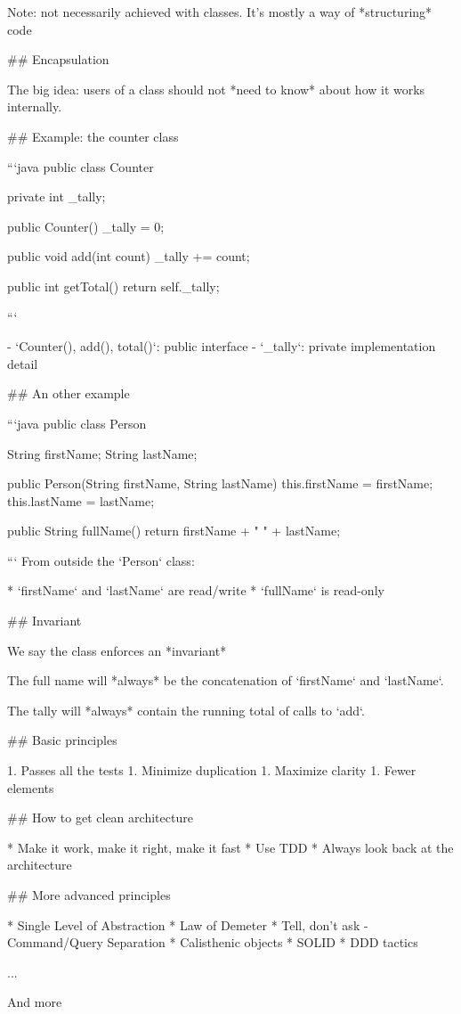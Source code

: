 Note: not necessarily achieved with classes. It's mostly a way
of *structuring* code

## Encapsulation

The big idea: users of a class should not *need to know* about
how it works internally.

## Example: the counter class

```java
public class Counter {
    private int _tally;

    public Counter() {
        _tally = 0;
    }

    public void add(int count) {
        _tally += count;
    }

    public int getTotal() {
        return self._tally;
    }
}
```

- `Counter(), add(), total()`: public interface
- `_tally`: private implementation detail


## An other example

```java
public class Person {
    String firstName;
    String lastName;

    public Person(String firstName, String lastName) {
        this.firstName = firstName;
        this.lastName = lastName;
    }

    public String fullName() {
        return firstName + " " + lastName;
    }
}
```
From outside the `Person` class:

* `firstName` and `lastName` are read/write
* `fullName` is read-only

## Invariant

We say the class enforces an *invariant*

The full name will *always* be the concatenation of `firstName`
and `lastName`.

The tally will *always* contain the running total of calls to `add`.

## Basic principles

1. Passes all the tests
1. Minimize duplication
1. Maximize clarity
1. Fewer elements


## How to get clean architecture

* Make it work, make it right, make it fast
* Use TDD
* Always look back at the architecture

## More advanced principles

* Single Level of Abstraction
* Law of Demeter
* Tell, don't ask - Command/Query Separation
* Calisthenic objects
* SOLID
* DDD tactics

...

And more

